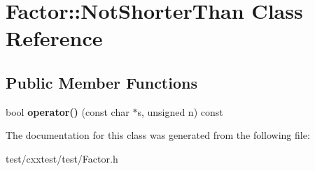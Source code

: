\hypertarget{classFactor_1_1NotShorterThan}{\section{Factor\-:\-:Not\-Shorter\-Than Class Reference}
\label{classFactor_1_1NotShorterThan}
}
\subsection*{Public Member Functions}
\begin{DoxyCompactItemize}
\item 
\hypertarget{classFactor_1_1NotShorterThan_a53d6a6b064c7cba3a3f40f0faf2885c2}{bool {\bfseries operator()} (const char $\ast$s, unsigned n) const }\label{classFactor_1_1NotShorterThan_a53d6a6b064c7cba3a3f40f0faf2885c2}

\end{DoxyCompactItemize}


The documentation for this class was generated from the following file\-:\begin{DoxyCompactItemize}
\item 
test/cxxtest/test/Factor.\-h\end{DoxyCompactItemize}
